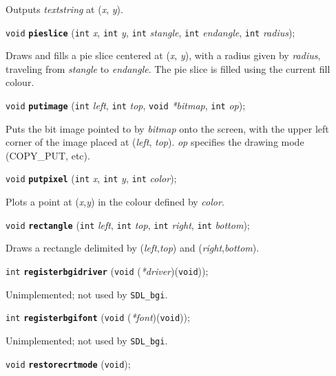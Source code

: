 \documentclass[a4paper,11pt]{article}
\newcommand{\SDLbgi}{\texttt{SDL\_bgi}}
\newcommand{\V}{\texttt{void}}      %
\newcommand{\I}{\texttt{int}}       %
\newcommand{\func}[1]{\textbf{\texttt{#1}}}  %
\newcommand{\A}[1]{\emph{#1}}       %
\newenvironment{bgi}
{ %
  \begin{snugshade}
}
{ %
  \end{snugshade}
}
\begin{document}
Outputs \A{textstring} at (\A{x}, \A{y}).


\begin{bgi}
\V{} \func{pieslice} (\I{} \A{x}, \I{} \A{y}, \I{} \A{stangle}, \I{}
\A{endangle}, \I{} \A{radius});
\end{bgi}

Draws and fills a pie slice centered at (\A{x}, \A{y}), with a radius
given by \A{radius}, traveling from \A{stangle} to \A{endangle}. The
pie slice is filled using the current fill colour.


\begin{bgi}
\V{} \func{putimage} (\I{} \A{left}, \I{} \A{top}, \V{} \A{*bitmap},
\I{} \A{op});
\end{bgi}

Puts the bit image pointed to by \A{bitmap} onto the screen, with the
upper left corner of the image placed at (\A{left}, \A{top}). \A{op}
specifies the drawing mode (COPY\_PUT, etc).


\begin{bgi}
\V{} \func{putpixel} (\I{} \A{x}, \I{} \A{y}, \I{} \A{color}); 
\end{bgi}

Plots a point at (\A{x},\A{y}) in the colour defined by \A{color}.


\begin{bgi}
\V{} \func{rectangle} (\I{} \A{left}, \I{} \A{top}, \I{} \A{right},
\I{} \A{bottom});
\end{bgi}

Draws a rectangle delimited by (\A{left},\A{top}) and
(\A{right},\A{bottom}).


\begin{bgi}
\I{} \func{registerbgidriver} (\V{} (\A{*driver})(\V{})); 
\end{bgi}

Unimplemented; not used by \SDLbgi.


\begin{bgi}
\I{} \func{registerbgifont} (\V{} (\A{*font})(\V{})); 
\end{bgi}

Unimplemented; not used by \SDLbgi.


\begin{bgi}
\V{} \func{restorecrtmode} (\V{}); 
\end{bgi}
\end{document}
